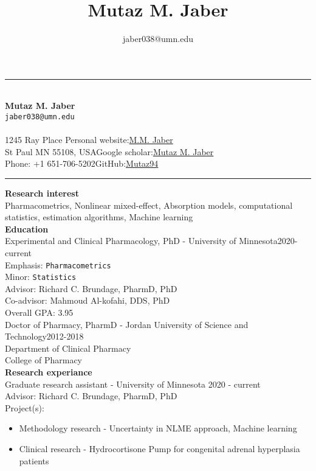 \documentclass[a4paper,11pt]{article}
\title{\LARGE\bfseries Mutaz M. \textbf{Jaber}}
\author{jaber038@umn.edu}
\date{}
\begin{document}
\rule{\textwidth}{1pt}
~\\[0.5cm]
{\centering\textbf{\LARGE Mutaz M. Jaber}\\[0.1cm] \texttt{jaber038@umn.edu} \\[-0.2cm]}
~\\[0.1cm]
1245 Ray Place \hfill Personal website:\href{https://mutaz94.github.io/}{M.M. Jaber}\\
St Paul MN 55108, USA\hfill Google scholar:\href{https://scholar.google.com/citations?user=uugc-IgAAAAJ&hl=en&authuser=1}{Mutaz M. Jaber}\\
Phone: +1 651-706-5202\hfill GitHub:\href{https://github.com/Mutaz94}{Mutaz94}\\
\rule{\textwidth}{1pt}

\textbf{Research interest}\\
Pharmacometrics, Nonlinear mixed-effect, Absorption models, computational statistics, estimation algorithms, Machine learning\\

\textbf{Education}\\[-0.3cm]

Experimental and Clinical Pharmacology, PhD - University of Minnesota\hfill 2020-current\\
Emphasis: \texttt{Pharmacometrics}\\
Minor: \texttt{Statistics}\\
Advisor: Richard C. Brundage, PharmD, PhD\\
Co-advisor: Mahmoud Al-kofahi, DDS, PhD\\
Overall GPA: 3.95\\[0.5cm]

Doctor of Pharmacy, PharmD - Jordan University of Science and Technology\hfill 2012-2018\\
Department of Clinical Pharmacy\\
College of Pharmacy\\[1cm]

\textbf{Research experiance}\\[-0.3cm]


Graduate research assistant - University of Minnesota \hfill 2020 - current \\
Advisor: Richard C. Brundage, PharmD, PhD \\
Project(s): 
\begin{itemize}
\item Methodology research - Uncertainty in NLME approach, Machine learning 
\item Clinical research - Hydrocortisone Pump for congenital adrenal hyperplasia patients
\end{itemize}
\end{document}
